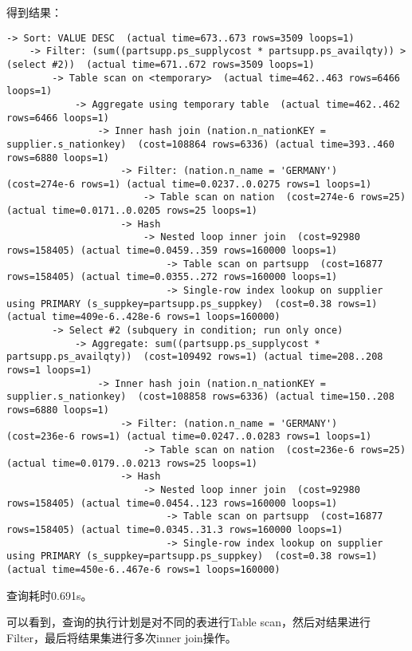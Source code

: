 \documentclass{article}
\begin{document}
得到结果：

\begin{lstlisting}
-> Sort: VALUE DESC  (actual time=673..673 rows=3509 loops=1)
    -> Filter: (sum((partsupp.ps_supplycost * partsupp.ps_availqty)) > (select #2))  (actual time=671..672 rows=3509 loops=1)
        -> Table scan on <temporary>  (actual time=462..463 rows=6466 loops=1)
            -> Aggregate using temporary table  (actual time=462..462 rows=6466 loops=1)
                -> Inner hash join (nation.n_nationKEY = supplier.s_nationkey)  (cost=108864 rows=6336) (actual time=393..460 rows=6880 loops=1)
                    -> Filter: (nation.n_name = 'GERMANY')  (cost=274e-6 rows=1) (actual time=0.0237..0.0275 rows=1 loops=1)
                        -> Table scan on nation  (cost=274e-6 rows=25) (actual time=0.0171..0.0205 rows=25 loops=1)
                    -> Hash
                        -> Nested loop inner join  (cost=92980 rows=158405) (actual time=0.0459..359 rows=160000 loops=1)
                            -> Table scan on partsupp  (cost=16877 rows=158405) (actual time=0.0355..272 rows=160000 loops=1)
                            -> Single-row index lookup on supplier using PRIMARY (s_suppkey=partsupp.ps_suppkey)  (cost=0.38 rows=1) (actual time=409e-6..428e-6 rows=1 loops=160000)
        -> Select #2 (subquery in condition; run only once)
            -> Aggregate: sum((partsupp.ps_supplycost * partsupp.ps_availqty))  (cost=109492 rows=1) (actual time=208..208 rows=1 loops=1)
                -> Inner hash join (nation.n_nationKEY = supplier.s_nationkey)  (cost=108858 rows=6336) (actual time=150..208 rows=6880 loops=1)
                    -> Filter: (nation.n_name = 'GERMANY')  (cost=236e-6 rows=1) (actual time=0.0247..0.0283 rows=1 loops=1)
                        -> Table scan on nation  (cost=236e-6 rows=25) (actual time=0.0179..0.0213 rows=25 loops=1)
                    -> Hash
                        -> Nested loop inner join  (cost=92980 rows=158405) (actual time=0.0454..123 rows=160000 loops=1)
                            -> Table scan on partsupp  (cost=16877 rows=158405) (actual time=0.0345..31.3 rows=160000 loops=1)
                            -> Single-row index lookup on supplier using PRIMARY (s_suppkey=partsupp.ps_suppkey)  (cost=0.38 rows=1) (actual time=450e-6..467e-6 rows=1 loops=160000)
\end{lstlisting}

查询耗时0.691s。

可以看到，查询的执行计划是对不同的表进行Table scan，然后对结果进行Filter，最后将结果集进行多次inner join操作。
\end{document}
